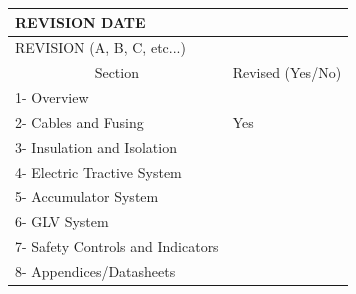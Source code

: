 \documentclass{article}
\begin{document}
        \begin{table}[H]
            \centering
            \begin{tabular}{|l|l|}
            \hline
            REVISION DATE &  \\ \hline
            REVISION (A, B, C, etc...) &  \\ \hline
            \multicolumn{1}{|c|}{Section} & \multicolumn{1}{c|}{Revised (Yes/No)} \\ \hline
            1- Overview &  \\ \hline
            2- Cables and Fusing &  Yes \\ \hline
            3- Insulation and Isolation &  \\ \hline
            4- Electric Tractive System &  \\ \hline
            5- Accumulator System &  \\ \hline
            6- GLV System &  \\ \hline
            7- Safety Controls and Indicators &  \\ \hline
            8- Appendices/Datasheets &  \\ \hline
            \end{tabular}
        \end{table}
\end{document}
